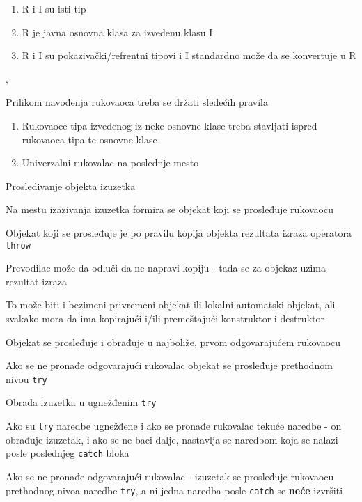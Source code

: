 \documentclass{article}
\newenvironment{xitemize}{%
    
    \itemize
    \larger
}{%
    \enditemize
}
\let\olditemize\itemize
\let\endolditemize\enditemize
\renewenvironment{itemize}{%
    \smaller
    \olditemize
}{%
    \endolditemize
}
\providecommand{\inlinecode}[1]{\texttt{#1}}
\begin{document}
\begin{xitemize}
\begin{itemize}
\begin{enumerate}
        \item R i I su isti tip
        \item R je javna osnovna klasa za izvedenu klasu I
        \item R i I su pokazivački/refrentni tipovi i I standardno može da se konvertuje u R
    \end{enumerate}‚
    \item Prilikom navođenja rukovaoca treba se držati sledećih pravila
    \begin{enumerate}
        \item Rukovaoce tipa izvedenog iz neke osnovne klase treba stavljati ispred rukovaoca tipa te osnovne klase
        \item Univerzalni rukovalac na poslednje mesto
    \end{enumerate}
\end{itemize}
\item Prosleđivanje objekta izuzetka
\begin{itemize}
    \item Na mestu izazivanja izuzetka formira se objekat koji se prosleđuje rukovaocu 
    \item Objekat koji se prosleđuje je po pravilu kopija objekta rezultata izraza operatora \inlinecode{throw}
    \item Prevodilac može da odluči da ne napravi kopiju - tada se za objekaz uzima rezultat izraza
    \item To može biti i bezimeni privremeni objekat ili lokalni automatski objekat, ali svakako mora da ima kopirajući i/ili premeštajući konstruktor i destruktor
    \item Objekat se prosleđuje i obrađuje u najboliže, prvom odgovarajućem rukovaocu
    \item Ako se ne pronađe odgovarajući rukovalac objekat se prosleđuje prethodnom nivou \inlinecode{try}
\end{itemize}
\item Obrada izuzetka u ugnežđenim \inlinecode{try}
\begin{itemize}
    \item Ako su \inlinecode{try} naredbe ugnežđene i ako se pronađe rukovalac tekuće naredbe - on obrađuje izuzetak, i ako se ne baci dalje, nastavlja se naredbom koja se nalazi posle poslednjeg \inlinecode{catch} bloka
    \item Ako se ne pronađe odgovarajući rukovalac - izuzetak se prosleđuje rukovaocu prethodnog nivoa naredbe \inlinecode{try}, a ni jedna naredba posle \inlinecode{catch} se \textbf{neće} izvršiti

\end{itemize}
\end{xitemize}
\end{document}
